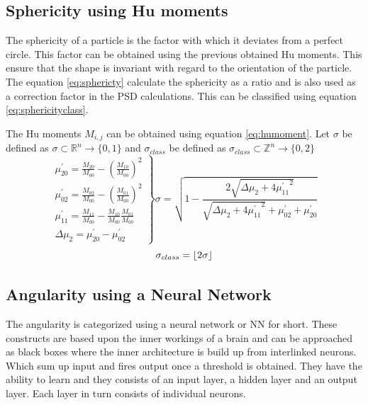 \documentclass[11pt,fleqn,,a4paper,twoside,openright]{book}
\begin{document}
\subsection{Sphericity using Hu moments} \label{HuMoments}
The sphericity of a particle is the factor with which it deviates from a perfect circle. This factor can be obtained using the previous obtained Hu moments. This ensure that the shape is invariant with regard to the orientation of the particle.
The equation \ref{eq:sphericty} calculate the sphericity as a ratio and is also used as a correction factor in the PSD calculations. This can be classified using equation \ref{eq:sphericityclass}.
\begin{sBox}
	The Hu moments $ M_{i,j} $ can be obtained using equation \ref{eq:humoment}. Let $\sigma $ be defined as $ \sigma \subset \mathbb{R}^n \rightarrow \{0, 1\} $ and $ \sigma_{class} $ be defined as $ \sigma_{class} \subset \mathbb{Z}^n \rightarrow \{0, 2\} $
	\begin{equation}\label{eq:sphericty}
	\left.
	\begin{array}{ll}
	\mu_{20}^{\prime} =\frac{M_{20}}{M_{00}} - \left(\frac{M_{10}}{M_{00}}\right)^2 \\[0.3cm]
	\mu_{02}^{\prime} =\frac{M_{02}}{M_{00}} - \left(\frac{M_{01}}{M_{00}}\right)^2 \\[0.3cm]
	\mu_{11}^{\prime} =\frac{M_{11}}{M_{00}} - \frac{M_{10}}{M_{00}} \frac{M_{01}}{M_{00}} \\[0.3cm]
	\Delta \mu_2 = \mu_{20}^{\prime} - \mu_{02}^{\prime}
	\end{array} \right\rbrace 	\sigma = \sqrt{1 - \frac{2 \sqrt{\Delta \mu_2 + 4 {\mu_{11}^{\prime}}^2}}{\sqrt{\Delta \mu_2 + 4 {\mu_{11}^{\prime}}^2} + \mu_{02}^{\prime} + \mu_{20}^{\prime}}}
	\end{equation}
	\begin{equation}\label{eq:sphericityclass}
	\sigma_{class} = \floor{2\sigma}
	\end{equation}
\end{sBox}

\subsection{Angularity using a Neural Network} \label{NeuralNet}
The angularity is categorized using a neural network or NN for short. These constructs are based upon the inner workings of a brain and can be approached as black boxes where the inner architecture is build up from interlinked neurons. Which sum up input and fires output once a threshold is obtained. They have the ability to learn and they consists of an input layer, a hidden layer and an output layer. Each layer in turn consists of individual neurons.
\end{document}
